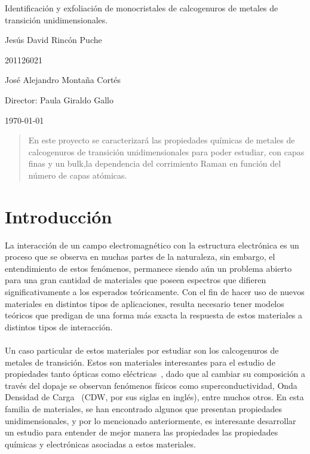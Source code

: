 \documentclass{article}
\begin{document}
\begin{center}
\Huge
Identificación y exfoliación de monocristales de calcogenuros de metales de transición unidimensionales.

\vspace{3mm}
\Large Jesús David Rincón Puche

\large
201126021

\Large José Alejandro Montaña Cortés
\large 


\vspace{2mm}
\Large
Director: Paula Giraldo Gallo\\


\normalsize
\vspace{2mm}

\today
\end{center}

\begin{abstract}
 En este proyecto se caracterizará las propiedades químicas de metales de calcogenuros de transición unidimensionales para poder estudiar, con capas finas y un bulk,la dependencia del corrimiento Raman en función del número de capas atómicas.
\end{abstract}

\normalsize
\section{Introducción}

La interacción de un campo electromagnético con la estructura electrónica es un proceso que se observa en muchas partes de la naturaleza, sin embargo, el entendimiento de estos fenómenos, permanece siendo aún un problema abierto para una gran cantidad de materiales que poseen espectros que difieren significativamente a los esperados teóricamente. Con el fin de hacer uso de nuevos materiales en distintos tipos de aplicaciones, resulta necesario tener modelos teóricos que predigan de una forma más exacta la respuesta de estos materiales a distintos tipos de interacción.\\\\

Un caso particular de estos materiales por estudiar son los calcogenuros de metales de transición. Estos son materiales interesantes para el estudio de propiedades tanto ópticas como eléctricas~\cite{dical}, dado que al cambiar su composición a través del dopaje se observan fenómenos físicos como superconductividad, Onda Densidad de Carga~\cite{CDW} (CDW, por sus siglas en inglés), entre muchos otros. En esta familia de materiales, se han encontrado algunos que presentan propiedades unidimensionales, y por lo mencionado anteriormente, es interesante desarrollar un estudio para entender de mejor manera las propiedades las propiedades químicas y electrónicas asociadas a estos materiales.
\end{document}
